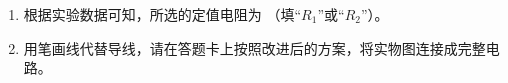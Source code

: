 \begin{enumerate}
\begin{enumerate}
\begin{enumerate}
\item 
根据实验数据可知，所选的定值电阻为 \underlinegap （填“$ R_{1} $”或“$ R_{2} $”）。


\item 
用笔画线代替导线，请在答题卡上按照改进后的方案，将实物图连接成完整电路。
\begin{figure}[h!]
	\centering
	
\end{figure}

\end{enumerate}

	
\end{enumerate}






\newpage
\gaokaojs


\end{enumerate}
